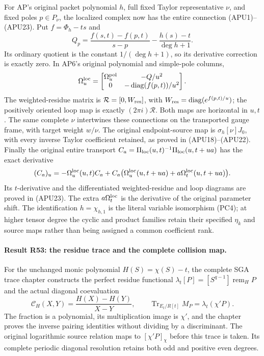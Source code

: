For AP's original packet polynomial \(h\), full fixed Taylor
representative \(\nu\), and fixed poles \(p\in P_\nu\), the
localized complex now has the entire connection
(APU1)--(APU23).  Put \(f=\Phi_h-ts\) and
\[
 Q_p=\frac{f(s,t)-f(p,t)}{s-p}-\frac{h(s)-t}{\deg h+1}.
\]
Its ordinary quotient is the constant \(1/(\deg h+1)\), so
its derivative correction is exactly zero.  In AP6's original
polynomial and simple-pole columns,
\[
 \Omega_u^{\rm loc}
 =\begin{bmatrix}
      \Omega_u^{\rm pol}&-Q/u^2\\
      0&-\operatorname{diag}(f(p,t))/u^2
   \end{bmatrix}.
\]
The weighted-residue matrix is
\(\mathcal R=[0,W_{\rm res}]\), with
\(W_{\rm res}=\operatorname{diag}(e^{f(p,t)/u})\);
the positively oriented loop map is exactly
\((2\pi i)\mathcal R\).
Both maps are horizontal in \(u,t\).
The same complete \(\nu\) intertwines these connections on
the transported gauge frame, with target weight \(w/\nu\).
The original endpoint-source map is
\(\sigma_h[\nu]J_0\), with every inverse Taylor coefficient
retained, as proved in (APU18)--(APU22).
Finally the original entire transport
\(C_a=\Pi_{\rm loc}(u,t)^{-1}\Pi_{\rm loc}(u,t+ua)\)
has the exact derivative
\[
 (C_a)_u=-\Omega_u^{\rm loc}(u,t)C_a+
 C_a\bigl(\Omega_u^{\rm loc}(u,t+ua)
                   +a\Omega_t^{\rm loc}(u,t+ua)\bigr).
\]
Its \(t\)-derivative and the differentiated weighted-residue and
loop diagrams are proved in (APU23).  The extra
\(a\Omega_t^{\rm loc}\) is the derivative of the original
parameter shift.  The identification \(h=\chi_{h,1}\) is the
literal variable isomorphism (PC4); at higher tensor degree the
cyclic and product families retain their specified
\(\eta_k\) and source maps rather than being assigned a common
coefficient rank.

\paragraph{Result R53: the residue trace and the complete collision map.}
For the unchanged monic polynomial \(H(S)=\chi(S)-t\), the complete
SGA trace chapter constructs the perfect residue functional
\(\lambda_t[P]=[S^{q-1}]\operatorname{rem}_H P\) and the actual
diagonal coevaluation
\[
 \mathcal C_H(X,Y)=\frac{H(X)-H(Y)}{X-Y},\qquad
 \operatorname{Tr}_{E_t/R[t]}M_P=\lambda_t(\chi'P).
\]
The fraction is a polynomial, its multiplication image is \(\chi'\),
and the chapter proves the inverse pairing identities without
dividing by a discriminant. The original logarithmic source
relation maps to \([\chi'P]_\chi\) before this trace is taken.
Its complete periodic diagonal resolution retains both odd and
positive even degrees.

